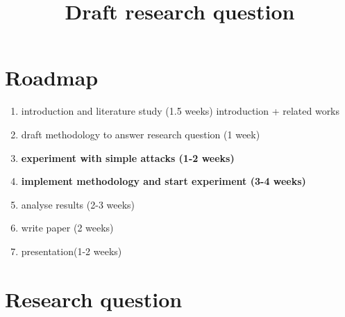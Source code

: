 \documentclass[11pt]{article}
\title{\textbf{Draft research question}}
\begin{document}
\maketitle

\section{Roadmap}

\begin{enumerate}
  \item introduction and literature study (1.5 weeks) introduction + related works
  \item draft methodology to answer research question (1 week)
  \item \textbf{experiment with simple attacks (1-2 weeks)}
  \item \textbf{implement methodology and start experiment (3-4 weeks)}
  \item analyse results (2-3 weeks)
  \item write paper (2 weeks)
  \item presentation(1-2 weeks)
\end{enumerate}

\section{Research question}
\end{document}
